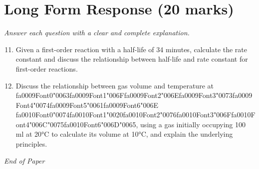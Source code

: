\documentclass[12pt]{article}
\begin{document}
\section*{Long Form Response (20 marks)}
\textit{Answer each question with a clear and complete explanation.}
\begin{enumerate}[label=\arabic*.]
\setcounter{enumi}{10}
\item Given a first-order reaction with a half-life of 34 minutes, calculate the rate constant
and discuss the relationship between half-life and rate constant for first-order
reactions.
\item Discuss the relationship between gas volume and temperature at {\csname fa0009Font0\endcsname\char"0063}{\csname fa0009Font1\endcsname\char"006F}{\csname fa0009Font2\endcsname\char"006E}{\csname fa0009Font3\endcsname\char"0073}{\csname fa0009Font4\endcsname\char"0074}{\csname fa0009Font5\endcsname\char"0061}{\csname fa0009Font6\endcsname\char"006E} {\csname fa0010Font0\endcsname\char"0074}{\csname fa0010Font1\endcsname\char"0020}{\csname fa0010Font2\endcsname\char"0076}{\csname fa0010Font3\endcsname\char"006F}{\csname fa0010Font4\endcsname\char"006C}{\char"0075}{\csname fa0010Font6\endcsname\char"006D}{\char"0065}, using a
gas initially occupying 100 ml at 20°C to calculate its volume at 10°C, and explain the
underlying principles.
\end{enumerate}

\vfill
\noindent\textit{End of Paper}
\end{document}
